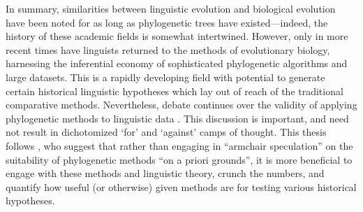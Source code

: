 In summary, similarities between linguistic evolution and biological evolution have been noted for as long as phylogenetic trees have existed---indeed, the history of these academic fields is somewhat intertwined. However, only in more recent times have linguists returned to the methods of evolutionary biology, harnessing the inferential economy of sophisticated phylogenetic algorithms and large datasets. This is a rapidly developing field with potential to generate certain historical linguistic hypotheses which lay out of reach of the traditional comparative methods. Nevertheless, debate continues over the validity of applying phylogenetic methods to linguistic data \autocite[e.g.][]{heggarty_interdisciplinary_2006}. This discussion is important, and need not result in dichotomized `for' and `against' camps of thought. This thesis follows \textcite[p.~2299]{greenhill_does_2009}, who suggest that rather than engaging in ``armchair speculation'' on the suitability of phylogenetic methods ``on a priori grounds'', it is more beneficial to engage with these methods and linguistic theory, crunch the numbers, and quantify how useful (or otherwise) given methods are for testing various historical hypotheses.

